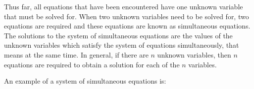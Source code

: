\label{m39257*id158940}Thus far, all equations that have been encountered have one unknown variable that must be solved for. When two unknown variables need to be solved for, two equations are required and these equations are known as simultaneous equations. The solutions to the system of simultaneous equations are the values of the unknown variables which satisfy the system of equations simultaneously, that means at the same time. In general, if there are \begin{math}n\end{math} unknown variables, then \begin{math}n\end{math} equations are required to obtain a solution for each of the \begin{math}n\end{math} variables.\par 
      \label{m39257*id158974}An example of a system of simultaneous equations is:\par 
      \label{m39257*uid92}\nopagebreak\noindent{}
    
